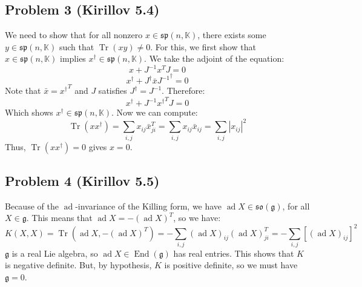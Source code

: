 \documentclass[12 pt]{article}
\newcommand{\K}{\mathbb{K}}
\newcommand{\fr}{\mathfrak}
\DeclareMathOperator{\Tr}{Tr}
\DeclareMathOperator {\End} {End}
\DeclareMathOperator {\ad} {ad}
\begin{document}
\subsection*{Problem 3 (Kirillov 5.4)}
We need to show that for all nonzero $x \in \fr{sp}(n, \K)$, there exists some $y \in  \fr{sp}(n, \K)$ such that $\Tr(xy) \neq 0$. For this, we first show that $x \in  \fr{sp}(n, \K)$ implies $x^{\dagger} \in \fr{sp}(n, \K)$. We take the adjoint of the equation:
\[         x + J^{-1} x^T J = 0        \]
\[         x^{\dagger} + J^{\dagger} \bar x {J^{-1}}^{\dagger} = 0         \]
Note that $\bar x = {x^{\dagger}}^T$ and $J$ satisfies $J^{\dagger} = J^{-1}$. Therefore:
\[       x^{\dagger} + J^{-1} {x^{\dagger}}^T  J   =0     \]
Which shows $x^{\dagger} \in \fr{sp}(n, \K)$. Now we can compute:
\[        \Tr(x x^{\dagger}) = \sum_{i, j} x_{ij} \bar x^{T}_{ji} =    \sum_{i, j} x_{ij} \bar x_{ij} = \sum_{i, j} |x_{ij}|^2  \]
Thus, $\Tr(x x^{\dagger}) = 0$ gives $x = 0$.


\subsection*{Problem 4 (Kirillov 5.5)}
Because of the $\ad$-invariance of the Killing form, we have $\ad X \in \fr{so}(\fr{g})$, for all $X\in \fr g$. This means that $\ad X = - (\ad X)^{T}$, so we have:
\[      K (X,X) = \Tr(\ad X, - (\ad X)^{T}) = - \sum_{i,j} (\ad X)_{ij} (\ad X)^T_{ji} = - \sum_{i,j} [(\ad X)_{ij}]^2       \]
$\fr g$ is a real Lie algebra, so $\ad X \in \End(\fr g)$ has real entries. This shows that $K$ is negative definite. But, by hypothesis, $K$ is positive definite, so we must have $\fr g = 0$.
\end{document}
